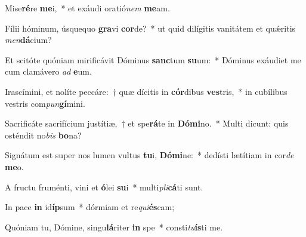 \item Mise\textbf{ré}re \textbf{me}i,~* et exáudi oratió\textit{nem} \textbf{me}am.
\item Fílii hóminum, úsquequo \textbf{gra}vi \textbf{cor}de?~* ut quid dilígitis vanitátem et quǽritis \textit{men}\textbf{dá}cium?
\item Et scitóte quóniam mirificávit Dóminus \textbf{sanc}tum \textbf{su}um:~* Dóminus exáudiet me cum clamávero \textit{ad} \textbf{e}um.
\item Irascímini, et nolíte peccáre:~† quæ dícitis in \textbf{cór}dibus \textbf{ves}tris,~* in cubílibus vestris com\textit{pun}\textbf{gí}mini.
\item Sacrificáte sacrifícium justítiæ,~† et spe\textbf{rá}te in \textbf{Dó}\textbf{mi}no.~* Multi dicunt: quis osténdit no\textit{bis} \textbf{bo}na?
\item Signátum est super nos lumen vultus \textbf{tu}i, \textbf{Dó}\textbf{mi}ne:~* dedísti lætítiam in cor\textit{de} \textbf{me}o.
\item A fructu fruménti, vini et \textbf{ó}lei \textbf{su}i~* multi\textit{pli}\textbf{cá}ti sunt.
\item In pace \textbf{in} id\textbf{íp}sum~* dórmiam et re\textit{qui}\textbf{és}cam;
\item Quóniam tu, Dómine, singu\textbf{lá}riter \textbf{in} spe~* consti\textit{tu}\textbf{ís}ti me.
